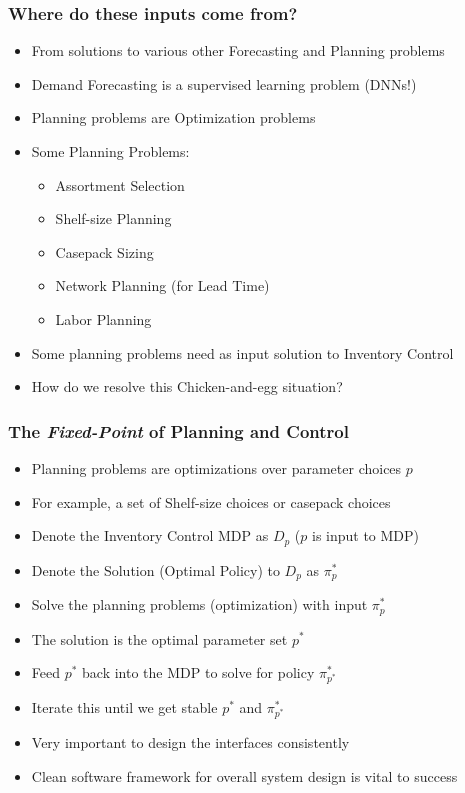 \documentclass[handout]{beamer}
\begin{document}
\begin{frame}
\frametitle{Where do these inputs come from?}
\pause
\begin{itemize}[<+->]
\item From solutions to various other Forecasting and Planning problems
\item Demand Forecasting is a supervised learning problem (DNNs!)
\item Planning problems are Optimization problems
\item Some Planning Problems:
\begin{itemize}
\item Assortment Selection
\item Shelf-size Planning
\item Casepack Sizing
\item Network Planning (for Lead Time)
\item Labor Planning
\end{itemize}
\item Some planning problems need as input solution to Inventory Control
\item How do we resolve this Chicken-and-egg situation?
\end{itemize}
\end{frame}

\begin{frame}
\frametitle{The {\em Fixed-Point} of Planning and Control}
\pause
\begin{itemize}[<+->]
\item Planning problems are optimizations over parameter choices $p$
\item For example, a set of Shelf-size choices or casepack choices
\item Denote the Inventory Control MDP as $D_p$ ($p$ is input to MDP)
\item Denote the Solution (Optimal Policy) to $D_p$ as $\pi^*_p$
\item Solve the planning problems (optimization) with input $\pi^*_p$
\item The solution is the optimal parameter set $p^*$
\item Feed $p^*$ back into the MDP to solve for policy $\pi^*_{p^*}$
\item Iterate this until we get stable $p^*$ and $\pi^*_{p^*}$
\item Very important to design the interfaces consistently
\item Clean software framework for overall system design is vital to success
\end{itemize}
\end{frame}
\end{document}
